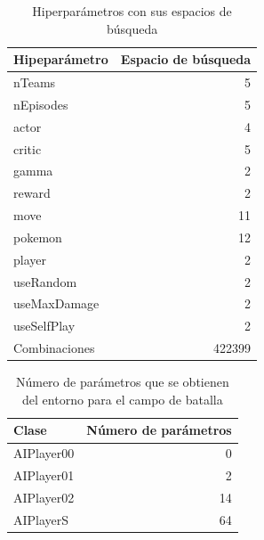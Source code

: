 \begin{table}[h]
    \centering
    \begin{tabular}{lr}
        \toprule
        Hipeparámetro & Espacio de búsqueda \\
        \midrule
        nTeams        & 5                   \\
        nEpisodes     & 5                   \\
        actor         & 4                   \\
        critic        & 5                   \\
        gamma         & 2                   \\
        reward        & 2                   \\
        move          & 11                  \\
        pokemon       & 12                  \\
        player        & 2                   \\
        useRandom     & 2                   \\
        useMaxDamage  & 2                   \\
        useSelfPlay   & 2                   \\
        \midrule
        Combinaciones & 422399              \\
        \bottomrule
    \end{tabular}
    \caption{Hiperparámetros con sus espacios de búsqueda}
    \label{tab:hyperparameters}
\end{table}

\begin{table}[h]
    \centering
    \begin{tabular}{lr}
        \toprule
        Clase      & Número de parámetros \\
        \midrule
        AIPlayer00 & 0                    \\
        AIPlayer01 & 2                    \\
        AIPlayer02 & 14                   \\
        AIPlayerS  & 64                   \\
        \bottomrule
    \end{tabular}
    \caption{Número de parámetros que se obtienen del entorno para el campo de batalla}
    \label{tab:battleParameters}
\end{table}


